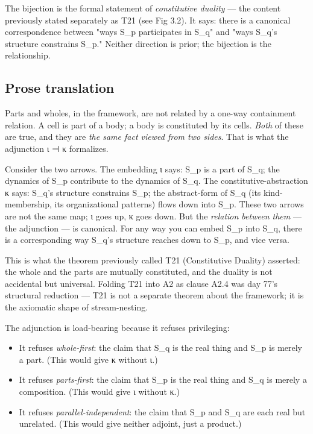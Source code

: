 \documentclass[11pt, openany]{book}
\begin{document}
The bijection is the formal statement of \textit{constitutive duality} --- the content previously stated separately as T21 (see Fig 3.2). It says: there is a canonical correspondence between "ways S\_\allowbreak{}p participates in S\_\allowbreak{}q" and "ways S\_\allowbreak{}q's structure constrains S\_\allowbreak{}p." Neither direction is prior; the bijection is the relationship.

\subsection{Prose translation}

Parts and wholes, in the framework, are not related by a one-way containment relation. A cell is part of a body; a body is constituted by its cells. \textit{Both} of these are true, and they are \textit{the same fact viewed from two sides}. That is what the adjunction ι ⊣ κ formalizes.

Consider the two arrows. The embedding ι says: S\_\allowbreak{}p is a part of S\_\allowbreak{}q; the dynamics of S\_\allowbreak{}p contribute to the dynamics of S\_\allowbreak{}q. The constitutive-abstraction κ says: S\_\allowbreak{}q's structure constrains S\_\allowbreak{}p; the abstract-form of S\_\allowbreak{}q (its kind-membership, its organizational patterns) flows down into S\_\allowbreak{}p. These two arrows are not the same map; ι goes up, κ goes down. But the \textit{relation between them} --- the adjunction --- is canonical. For any way you can embed S\_\allowbreak{}p into S\_\allowbreak{}q, there is a corresponding way S\_\allowbreak{}q's structure reaches down to S\_\allowbreak{}p, and vice versa.

This is what the theorem previously called T21 (Constitutive Duality) asserted: the whole and the parts are mutually constituted, and the duality is not accidental but universal. Folding T21 into A2 as clause A2.4 was day 77's structural reduction --- T21 is not a separate theorem about the framework; it is the axiomatic shape of stream-nesting.

The adjunction is load-bearing because it refuses privileging:
\begin{itemize}
\item It refuses \textit{whole-first}: the claim that S\_\allowbreak{}q is the real thing and S\_\allowbreak{}p is merely a part. (This would give κ without ι.)
\item It refuses \textit{parts-first}: the claim that S\_\allowbreak{}p is the real thing and S\_\allowbreak{}q is merely a composition. (This would give ι without κ.)
\item It refuses \textit{parallel-independent}: the claim that S\_\allowbreak{}p and S\_\allowbreak{}q are each real but unrelated. (This would give neither adjoint, just a product.)
\end{itemize}
\end{document}
